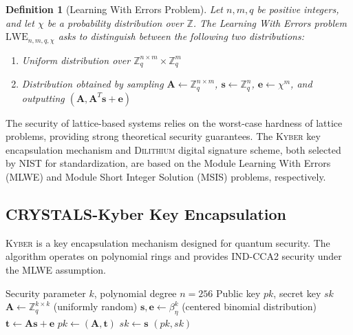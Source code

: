 ﻿\documentclass[12pt,a4paper,twoside]{book}
\newcommand{\kyber}{\textsc{Kyber}}
\newcommand{\dilithium}{\textsc{Dilithium}}
\newtheorem{definition}[theorem]{Definition}
\begin{document}
\begin{definition}[Learning With Errors Problem]
\label{def:lwe}
Let $n, m, q$ be positive integers, and let $\chi$ be a probability distribution over $\mathbb{Z}$. The Learning With Errors problem $\text{LWE}_{n,m,q,\chi}$ asks to distinguish between the following two distributions:
\begin{enumerate}
\item Uniform distribution over $\mathbb{Z}_q^{n \times m} \times \mathbb{Z}_q^m$
\item Distribution obtained by sampling $\mathbf{A} \leftarrow \mathbb{Z}_q^{n \times m}$, $\mathbf{s} \leftarrow \mathbb{Z}_q^n$, $\mathbf{e} \leftarrow \chi^m$, and outputting $(\mathbf{A}, \mathbf{A}^T\mathbf{s} + \mathbf{e})$
\end{enumerate}
\end{definition}

The security of lattice-based systems relies on the worst-case hardness of lattice problems, providing strong theoretical security guarantees. The \kyber{} key encapsulation mechanism and \dilithium{} digital signature scheme, both selected by NIST for standardization, are based on the Module Learning With Errors (MLWE) and Module Short Integer Solution (MSIS) problems, respectively.

\subsection{CRYSTALS-Kyber Key Encapsulation}
\label{subsec:kyber}

\kyber{} is a key encapsulation mechanism designed for quantum security. The algorithm operates on polynomial rings and provides IND-CCA2 security under the MLWE assumption.

\begin{algorithm}
\caption{\kyber{} Key Generation}
\label{alg:kyber-keygen}
\begin{algorithmic}[1]
\REQUIRE Security parameter $k$, polynomial degree $n = 256$
\ENSURE Public key $pk$, secret key $sk$
\STATE $\mathbf{A} \leftarrow \mathbb{Z}_q^{k \times k}$ (uniformly random)
\STATE $\mathbf{s}, \mathbf{e} \leftarrow \beta_\eta^k$ (centered binomial distribution)
\STATE $\mathbf{t} \leftarrow \mathbf{A}\mathbf{s} + \mathbf{e}$
\STATE $pk \leftarrow (\mathbf{A}, \mathbf{t})$
\STATE $sk \leftarrow \mathbf{s}$
\RETURN $(pk, sk)$
\end{algorithmic}
\end{algorithm}
\end{document}
